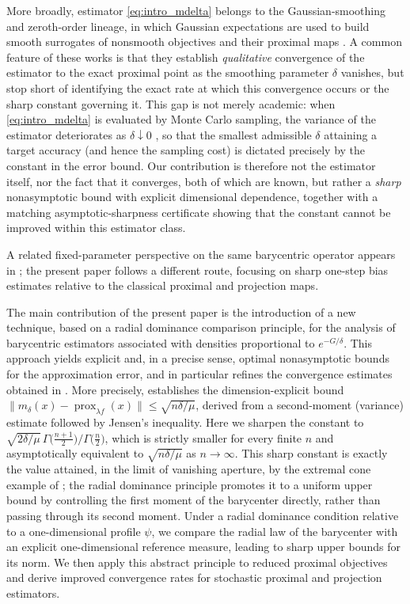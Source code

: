 \documentclass[11pt]{article}
\newcommand{\1}{\mathds{1}}
\theoremstyle{definition}
\theoremstyle{remark}
\theoremstyle{definition}
\begin{document}
More broadly, estimator \eqref{eq:intro_mdelta} belongs to the
Gaussian-smoothing and zeroth-order lineage, in which Gaussian expectations
are used to build smooth surrogates of nonsmooth objectives and their
proximal maps \cite{NesterovSpokoiny2017}. A common feature of these works
is that they establish \emph{qualitative} convergence of the estimator to
the exact proximal point as the smoothing parameter \(\delta\) vanishes,
but stop short of identifying the exact rate at which this convergence
occurs or the sharp constant governing it. This gap is not merely academic:
when \eqref{eq:intro_mdelta} is evaluated by Monte Carlo sampling, the
variance of the estimator deteriorates as \(\delta\downarrow 0\)
\cite{NaldiLabarriereMolinariVilla2026}, so that the smallest admissible
\(\delta\) attaining a target accuracy (and hence the sampling cost) is
dictated precisely by the constant in the error bound. Our contribution is
therefore not the estimator itself, nor the fact that it converges, both of
which are known, but rather a \emph{sharp} nonasymptotic bound with explicit
dimensional dependence, together with a matching asymptotic-sharpness
certificate showing that the constant cannot be improved within this
estimator class.  

A related fixed-parameter perspective on the same barycentric
operator appears in \cite{NaldiLabarriereMolinariVilla2026}; the present
paper follows a different route, focusing on sharp one-step bias estimates
relative to the classical proximal and projection maps.

The main contribution of the present paper is the introduction of a new
technique, based on a radial dominance comparison principle, for the
analysis of barycentric estimators associated with densities proportional
to \(e^{-G/\delta}\). This approach yields explicit and, in a precise
sense, optimal nonasymptotic bounds for the approximation error, and in
particular refines the convergence estimates obtained in \cite{MPV2026}. More precisely, \cite{MPV2026} establishes the dimension-explicit bound
$\|m_\delta(x)-\operatorname{prox}_{\lambda f}(x)\|\le\sqrt{n\delta/\mu}$,
derived from a second-moment (variance) estimate followed by Jensen's
inequality. Here we sharpen the constant to
$\sqrt{2\delta/\mu}\,\Gamma\!\big(\tfrac{n+1}{2}\big)/\Gamma\!\big(\tfrac{n}{2}\big)$,
which is strictly smaller for every finite $n$ and asymptotically equivalent
to $\sqrt{n\delta/\mu}$ as $n\to\infty$. This sharp constant is exactly the
value attained, in the limit of vanishing aperture, by the extremal cone
example of \cite{MPV2026}; the radial dominance principle promotes it to a
uniform upper bound by controlling the first moment of the barycenter
directly, rather than passing through its second moment.
Under a radial dominance condition relative to a one-dimensional profile
\(\psi\), we compare the radial law of the barycenter with an explicit
one-dimensional reference measure, leading to sharp upper bounds for its
norm. We then apply this abstract principle to reduced proximal
objectives and derive improved convergence rates for stochastic proximal
and projection estimators.
\end{document}
